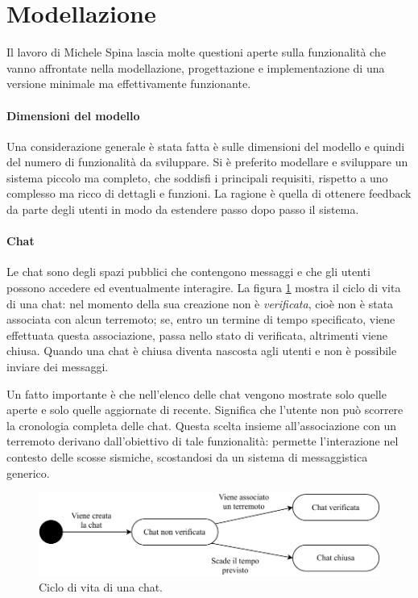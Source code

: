 \section{Modellazione}

Il lavoro di Michele Spina lascia molte questioni aperte sulla funzionalità che vanno affrontate nella modellazione, progettazione e implementazione di una versione minimale ma effettivamente funzionante.

\paragraph{Dimensioni del modello} Una considerazione generale è stata fatta è sulle dimensioni del modello e quindi del numero di funzionalità da sviluppare. Si è preferito modellare e sviluppare un sistema piccolo ma completo, che soddisfi i principali requisiti, rispetto a uno complesso ma ricco di dettagli e funzioni. La ragione è quella di ottenere feedback da parte degli utenti in modo da estendere passo dopo passo il sistema.

\paragraph{Chat} Le chat sono degli spazi pubblici che contengono messaggi e che gli utenti possono accedere ed eventualmente interagire. La figura \ref{fig:chat_ciclo} mostra il ciclo di vita di una chat: nel momento della sua creazione non è \textit{verificata}, cioè non è stata associata con alcun terremoto; se, entro un termine di tempo specificato, viene effettuata questa associazione, passa nello stato di verificata, altrimenti viene chiusa. Quando una chat è chiusa diventa nascosta agli utenti e non è possibile inviare dei messaggi.

Un fatto importante è che nell'elenco delle chat vengono mostrate solo quelle aperte e solo quelle aggiornate di recente. Significa che l'utente non può scorrere la cronologia completa delle chat. Questa scelta insieme all'associazione con un terremoto derivano dall'obiettivo di tale funzionalità: permette l'interazione nel contesto delle scosse sismiche, scostandosi da un sistema di messaggistica generico.

\begin{figure}[ht!]
\centering
\includegraphics[width=\textwidth]{assets/02/chat_ciclo.pdf}
\caption{Ciclo di vita di una chat.}
\label{fig:chat_ciclo}
\end{figure}

